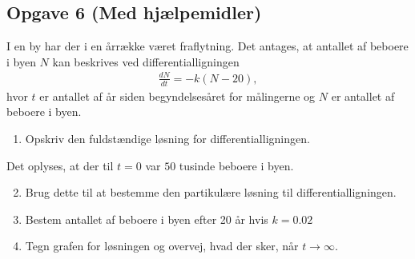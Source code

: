\subsection*{Opgave 6 (Med hjælpemidler)}
I en by har der i en årrække været fraflytning. Det antages, at antallet af beboere i byen $N$ kan beskrives ved differentialligningen
\begin{align*}
	\frac{dN}{dt} = -k(N - 20),
\end{align*}
hvor $t$ er antallet af år siden begyndelsesåret for målingerne og $N$ er antallet af beboere i byen.
\begin{enumerate}[label=\roman*)]
	\item Opskriv den fuldstændige løsning for differentialligningen. 
\end{enumerate}
Det oplyses, at der til $t = 0$ var $50$ tusinde beboere i byen.
\begin{enumerate}[label=\roman*)]
	\setcounter{enumi}{1}
	\item Brug dette til at bestemme den partikulære løsning til differentialligningen. 
	\item Bestem antallet af beboere i byen efter 20 år hvis $k = 0.02$
	\item Tegn grafen for løsningen og overvej, hvad der sker, når $t \to \infty$.
\end{enumerate}
